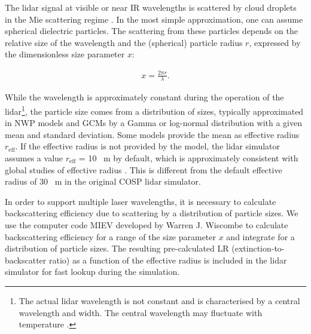 The lidar signal at visible or near IR wavelengths is scattered by
cloud droplets in the Mie scattering regime \citep{mie1908}.
In the most simple approximation,
one can assume spherical dielectric particles. The scattering from these particles depends on the
relative size of the wavelength and the (spherical) particle radius $r$, expressed by the
dimensionless size parameter $x$:

\begin{align}
x = \frac{2\pi r}{\lambda} .
\end{align}

\noindent
While the wavelength is approximately constant during the operation of the lidar\footnote{The actual lidar wavelength is not constant and is characterised
by a central wavelength and width. The central wavelength may fluctuate with
temperature \citep{wiegner2015}.},
the particle size comes from a distribution of sizes, typically approximated
in NWP models and GCMs by a Gamma or log-normal distribution with a given mean
and standard deviation. Some models provide the mean as effective radius $r_\text{eff}$.
If the effective radius is not provided by the model, the lidar simulator
assumes a value $r_\text{eff}$ = 10 \unit{\mu m} by default, which is approximately
consistent with global studies of effective radius
\citep{breon2000,breon2005,hu2007b,zhang2011,rausch2017,fu2019}. This
is different from the default effective radius of 30 \unit{\mu m} in the
original COSP lidar simulator.

In order to support multiple laser wavelengths, it is necessary
to calculate backscattering efficiency due to scattering by a distribution
of particle sizes. We use the computer code MIEV developed by Warren J. Wiscombe
\citep{wiscombe1979,wiscombe1980} to
calculate backscattering efficiency for a range of the size parameter
$x$ and integrate for a distribution of particle sizes. The resulting
pre-calculated LR (extinction-to-backscatter ratio) as a function
of the effective radius is included in the lidar simulator for fast lookup
during the simulation.

